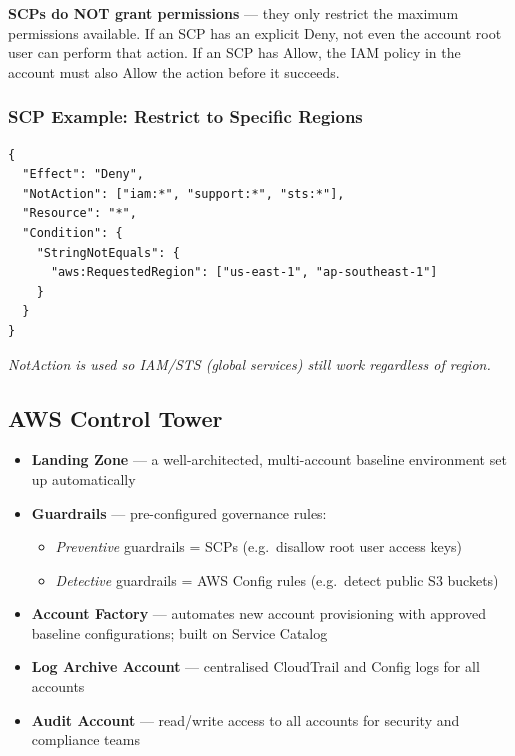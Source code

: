 \begin{gotcha}
\textbf{SCPs do NOT grant permissions} --- they only restrict the maximum permissions available. If an SCP has an explicit Deny, not even the account root user can perform that action. If an SCP has Allow, the IAM policy in the account must also Allow the action before it succeeds.
\end{gotcha}

\subsubsection{SCP Example: Restrict to Specific Regions}
\begin{verbatim}
{
  "Effect": "Deny",
  "NotAction": ["iam:*", "support:*", "sts:*"],
  "Resource": "*",
  "Condition": {
    "StringNotEquals": {
      "aws:RequestedRegion": ["us-east-1", "ap-southeast-1"]
    }
  }
}
\end{verbatim}
\textit{\small NotAction is used so IAM/STS (global services) still work regardless of region.}

\subsection{AWS Control Tower}

\begin{keyfacts}
\begin{itemize}
  \item \textbf{Landing Zone} --- a well-architected, multi-account baseline environment set up automatically
  \item \textbf{Guardrails} --- pre-configured governance rules:
    \begin{itemize}
      \item \emph{Preventive} guardrails = SCPs (e.g.\ disallow root user access keys)
      \item \emph{Detective} guardrails = AWS Config rules (e.g.\ detect public S3 buckets)
    \end{itemize}
  \item \textbf{Account Factory} --- automates new account provisioning with approved baseline configurations; built on Service Catalog
  \item \textbf{Log Archive Account} --- centralised CloudTrail and Config logs for all accounts
  \item \textbf{Audit Account} --- read/write access to all accounts for security and compliance teams
\end{itemize}
\end{keyfacts}

